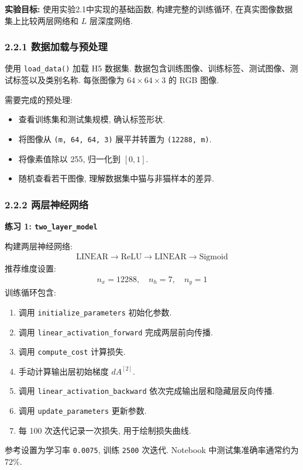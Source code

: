 \documentclass{../../nndlcourse}
\begin{document}
\textbf{实验目标: }使用实验2.1中实现的基础函数, 构建完整的训练循环, 在真实图像数据集上比较两层网络和 $L$ 层深度网络.

\subsubsection*{2.2.1 数据加载与预处理}

使用 \texttt{load\_data()} 加载 H5 数据集. 数据包含训练图像、训练标签、测试图像、测试标签以及类别名称. 每张图像为 $64\times64\times3$ 的 RGB 图像.

需要完成的预处理:
\begin{itemize}
    \item 查看训练集和测试集规模, 确认标签形状.
    \item 将图像从 \texttt{(m, 64, 64, 3)} 展平并转置为 \texttt{(12288, m)}.
    \item 将像素值除以 255, 归一化到 $[0,1]$.
    \item 随机查看若干图像, 理解数据集中猫与非猫样本的差异.
\end{itemize}

\subsubsection*{2.2.2 两层神经网络}

\textbf{练习 1: \texttt{two\_layer\_model}}

构建两层神经网络:
\begin{align}
    \mathrm{LINEAR}\to\mathrm{ReLU}\to\mathrm{LINEAR}\to\mathrm{Sigmoid}
\end{align}
推荐维度设置:
\begin{align}
    n_x=12288,\quad n_h=7,\quad n_y=1
\end{align}
训练循环包含:
\begin{enumerate}
    \item 调用 \texttt{initialize\_parameters} 初始化参数.
    \item 调用 \texttt{linear\_activation\_forward} 完成两层前向传播.
    \item 调用 \texttt{compute\_cost} 计算损失.
    \item 手动计算输出层初始梯度 $dA^{[2]}$.
    \item 调用 \texttt{linear\_activation\_backward} 依次完成输出层和隐藏层反向传播.
    \item 调用 \texttt{update\_parameters} 更新参数.
    \item 每 100 次迭代记录一次损失, 用于绘制损失曲线.
\end{enumerate}
参考设置为学习率 \texttt{0.0075}, 训练 \texttt{2500} 次迭代. Notebook 中测试集准确率通常约为 $72\%$.
\end{document}
